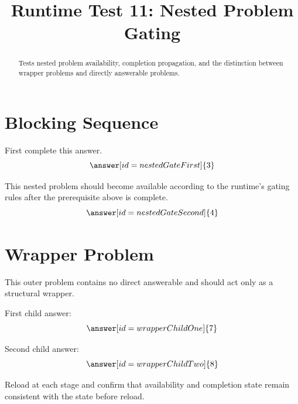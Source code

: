 \documentclass{ximera}
\title{Runtime Test 11: Nested Problem Gating}
\begin{document}
\begin{abstract}
Tests nested problem availability, completion propagation, and the distinction
between wrapper problems and directly answerable problems.
\end{abstract}
\maketitle

\section{Blocking Sequence}

\begin{problem}
First complete this answer.
\[
\answer[id=nestedGateFirst]{3}
\]

\begin{problem}
This nested problem should become available according to the runtime's gating
rules after the prerequisite above is complete.
\[
\answer[id=nestedGateSecond]{4}
\]
\end{problem}
\end{problem}

\section{Wrapper Problem}

\begin{problem}
This outer problem contains no direct answerable and should act only as a
structural wrapper.

\begin{problem}
First child answer:
\[
\answer[id=wrapperChildOne]{7}
\]
\end{problem}

\begin{problem}
Second child answer:
\[
\answer[id=wrapperChildTwo]{8}
\]
\end{problem}
\end{problem}

Reload at each stage and confirm that availability and completion state remain
consistent with the state before reload.
\end{document}
